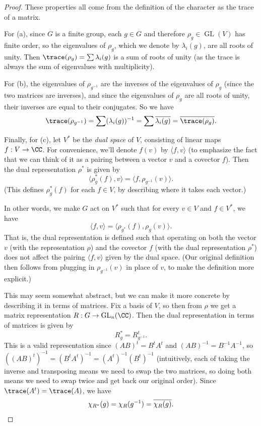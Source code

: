 \begin{proof}
These properties all come from the definition of the character as the trace of a matrix. 

For (a), since $G$ is a finite group, each $g \in G$ and therefore $\rho_g \in \operatorname{GL}(V)$ has finite order, so the eigenvalues of $\rho_g$, which we denote by $\lambda_i(g)$, are all roots of unity. Then $\trace(\rho_g) = \sum \lambda_i(g)$ is a sum of roots of unity (as the trace is always the sum of eigenvalues with multiplicity). 
    
For (b), the eigenvalues of $\rho_{g^{-1}}$ are the inverses of the eigenvalues of $\rho_g$ (since the two matrices are inverses), and since the eigenvalues of $\rho_g$ are all roots of unity, their inverses are equal to their conjugates. So we have \[\trace(\rho_{g^{-1}}) = \sum (\lambda_i(g))^{-1} = \sum \overline{\lambda_i(g)} = \overline{\trace(\rho_g)}.\] 
    
Finally, for (c), let $V^*$ be the \emph{dual space} of $V$, consisting of linear maps $f : V \to \CC$. For convenience, we'll denote $f(v)$ by $\langle f, v \rangle$ (to emphasize the fact that we can think of it as a pairing between a vector $v$ and a covector $f$). Then the dual representation $\rho^*$ is given by \[\langle \rho^*_g(f), v \rangle = \langle f, \rho_{g^{-1}}(v) \rangle.\] (This defines $\rho^*_g(f)$ for each $f \in V$, by describing where it takes each vector.) 

    
In other words, we make $G$ act on $V^*$ such that for every $v \in V$ and $f \in V^*$, we have \[\langle f, v \rangle = \langle \rho_{g^*}(f), \rho_g(v) \rangle.\] That is, the dual representation is defined such that operating on both the vector $v$ (with the representation $\rho$) and the covector $f$ (with the dual representation $\rho^*$) does not affect the pairing $\langle f, v \rangle$ given by the dual space. (Our original definition then follows from plugging in $\rho_{g^{-1}}(v)$ in place of $v$, to make the definition more explicit.)

This may seem somewhat abstract, but we can make it more concrete by describing it in terms of matrices. Fix a basis of $V$, so then from $\rho$ we get a matrix representation $R : G \to \operatorname{GL}_n(\CC)$. Then the dual representation in terms of matrices is given by \[R_g^* = R_{g^{-1}}^t.\] This is a valid representation since $(AB)^t = B^tA^t$ and $(AB)^{-1} = B^{-1}A^{-1}$, so $((AB)^t)^{-1} = (B^tA^t)^{-1} = (A^t)^{-1}(B^t)^{-1}$ (intuitively, each of taking the inverse and transposing means we need to swap the two matrices, so doing both means we need to swap twice and get back our original order). Since $\trace(A^t) = \trace(A)$, we have \[\chi_{R^*}(g) = \chi_R(g^{-1}) = \overline{\chi_R(g)}.\qedhere\] 



\end{proof}
